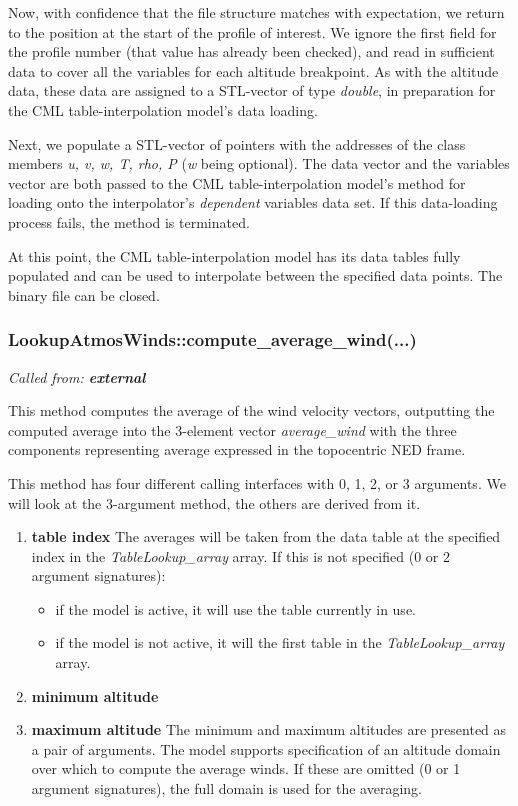 \documentclass[11pt,fleqn]{report}
\begin{document}
Now, with confidence that the file structure matches with expectation,
we return to the
position at the start of the profile of interest. We ignore the first field
for the profile number (that value has already been checked), and read in
sufficient
data to cover all the variables for each altitude breakpoint. As with the
altitude data, these data are assigned to a
STL-vector of type \textit{double}, in preparation for the CML
table-interpolation model's data loading.

Next, we populate a STL-vector of pointers with the addresses of the class
members \textit{u, v, w, T, rho, P} (\textit{w} being optional). The data vector
and the variables vector are both passed to the CML table-interpolation
model's method for loading onto the interpolator's
\textit{dependent} variables data set. If this data-loading process fails,
the method is terminated.

At this point, the CML table-interpolation model has its data tables
fully populated and can be used to interpolate between the specified data
points. The binary file can be closed.


\subsubsection{LookupAtmosWinds::compute\_average\_wind(...)}
\textit{Called from: \textbf{external}}

This method computes the average of the wind velocity vectors, outputting
the computed average into the 3-element vector \textit{average\_wind} with
the three components representing average expressed in the topocentric
NED frame.

This method has four different calling interfaces with 0, 1, 2, or 3
arguments. We will look at the 3-argument method, the others are derived
from it.
\begin{enumerate}
\item \textbf{table index} The averages will be taken from the data table at
  the specified index in the \textit{TableLookup\_array} array. If this is
  not specified (0 or 2 argument signatures):
  \begin{itemize}
  \item if the model is active, it will use the table currently in use.
  \item if the model is not active, it will the first table in the
    \textit{TableLookup\_array} array.
  \end{itemize}
\item \textbf{minimum altitude}
\item \textbf{maximum altitude} The minimum and maximum altitudes are
  presented as a pair of arguments. The model supports specification of an
  altitude domain over which to compute the average winds.
  If these are omitted (0 or 1 argument
  signatures), the full domain is used for the averaging.
\end{enumerate}
\end{document}
